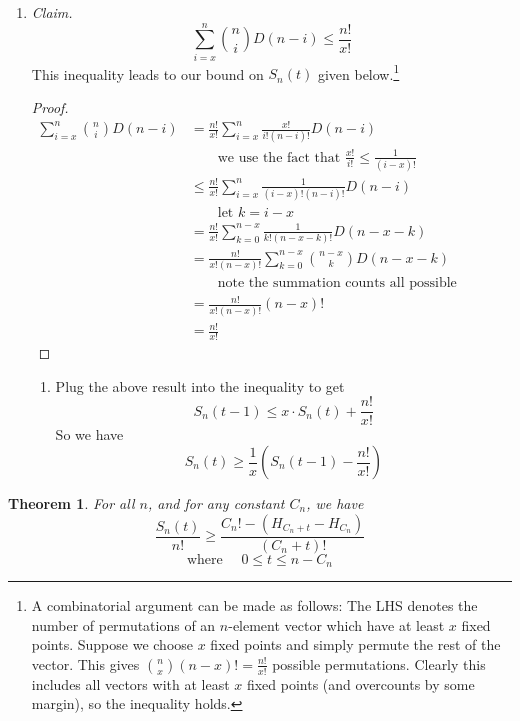 \documentclass[12pt, a4paper]{article}
\newtheorem{theorem}{Theorem}
\begin{document}
\begin{enumerate}
		\item\textit{Claim.}
			\begin{equation*}
			\sum_{i=x}^n\binom{n}{i}D(n-i) \le \frac{n!}{x!}
			\end{equation*}
			This inequality leads to our bound on $S_{n}(t)$ given
			below.\footnote{A combinatorial argument can be made as follows: The LHS
			denotes the number of permutations of an $n$-element vector which have
			at least $x$ fixed points. Suppose we choose $x$ fixed points and
			simply permute the rest of the vector. This gives $\binom{n}{x}(n-x)!
			=\frac{n!}{x!}$ possible permutations. Clearly this includes all
			vectors with at least $x$ fixed points (and overcounts by some
			margin), so the inequality holds.}
			\begin{proof}
				\begin{align*}
				\sum_{i=x}^n\binom{n}{i}D(n-i) & =
				\frac{n!}{x!}\sum_{i=x}^{n}\frac{x!}{i!(n-i)!}D(n-i)\\
				& \qquad\text{we use the fact that }\frac{x!}{i!}\le\frac{1}{(i-x)!}\\
				& \le \frac{n!}{x!}\sum_{i=x}^{n}\frac{1}{(i-x)!(n-i)!}D(n-i)\\
				& \qquad\text{let $k=i-x$}\\
				& = \frac{n!}{x!}\sum_{k=0}^{n-x}\frac{1}{k!(n-x-k)!}D(n-x-k)\\
				& = \frac{n!}{x!(n-x)!}\sum_{k=0}^{n-x}\binom{n-x}{k}D(n-x-k)\\
				& \qquad\text{note the summation counts all possible permutations}\\
				& = \frac{n!}{x!(n-x)!}(n-x)!\\
				& = \frac{n!}{x!}				
				\end{align*}
			\end{proof}		
		\begin{enumerate}
		\item Plug the above result into the inequality to get
			\begin{equation*}
			S_{n}(t-1) \le x\cdot S_{n}(t) + \frac{n!}{x!}
			\end{equation*}
		So we have
			\begin{equation*}
			S_{n}(t)\ge \frac{1}{x}\left(S_{n}(t-1)-\frac{n!}{x!}\right)
			\end{equation*}
		\end{enumerate}
	\end{enumerate}
	\clearpage
		\begin{theorem} For all $n$, and for any constant $C_n$, we have
			\begin{equation*}
			\frac{S_{n}(t)}{n!}\ge \frac{C_{n}! - (H_{C_{n}+t} - H_{C_{n}})}{(C_n+t)!}
			\end{equation*}
			\begin{equation*}
			\text{where }\quad0\le t\le n-C_{n}
			\end{equation*}
		\end{theorem}
\end{document}
